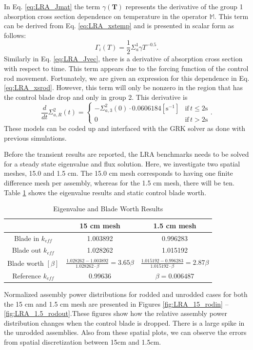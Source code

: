 \documentclass{ansconf}
\numberwithin{equation}{section}
\begin{document}
In Eq. \eqref{eq:LRA_Jmat} the term $\gamma\left(\boldsymbol{T}\right)$  represents the derivative of the group 1 absorption cross section dependence on temperature in the operator $\mathbb{M}$. This term can be derived from Eq. \eqref{eq:LRA_xstemp} and is presented in scalar form as follows:
\begin{equation}
    \Gamma_i\left(T\right) = \frac{1}{2}\Sigma_a^1\gamma T^{-0.5}.
\end{equation}
Similarly in Eq. \eqref{eq:LRA_Jvec}, there is a derivative of absorption cross section with respect to time. This term appears due to the forcing function of the control rod movement. Fortunately, we are given an expression for this dependence in Eq. \eqref{eq:LRA_xsrod}. However, this term will only be nonzero in the region that has the control blade drop and only in group 2. This derivative is
\begin{equation}
    \frac{d}{dt}\Sigma_{a,R}^2\left(t\right) = \left\lbrace \begin{array}{cc} -\Sigma_{a,3}^2\left(0\right)\cdot 0.0606184\left[\mathrm{s}^{-1}\right] & \mathrm{if}\,t\le 2\mathrm{s} \\
    0 & \mathrm{if}\,t > 2\mathrm{s} \end{array}\right. .
\end{equation}
These models can be coded up and interfaced with the GRK solver as done with previous simulations. 


Before the transient results are reported, the LRA benchmarks needs to be solved for a steady state eigenvalue and flux solution. Here, we investigate two spatial meshes, 15.0 and 1.5 cm. The 15.0 cm mesh corresponds to having one finite difference mesh per assembly, whereas for the 1.5 cm mesh, there will be ten. Table \ref{tab:LRA_eigs} shows the eigenvalue results and static control blade worth.
\begin{table}
\centering
\caption{Eigenvalue and Blade Worth Results}
\label{tab:LRA_eigs}
\begin{tabular}{ccc}
\toprule 
 & 15 cm mesh & 1.5 cm mesh\tabularnewline
\midrule
\midrule 
Blade in $k_{eff}$ & 1.003892 & 0.996283\tabularnewline
\midrule 
Blade out $k_{eff}$ & 1.028262 & 1.015192\tabularnewline
\midrule 
Blade worth $\left[\beta\right]$ & $\frac{1.028262-1.003892}{1.028262\cdot\beta}=3.65\beta$ & $\frac{1.015192-0.996283}{1.015192\cdot\beta}=2.87\beta$\tabularnewline
\midrule
\midrule
Reference $k_{eff}$ & 0.99636 & $\beta=0.006487$ \tabularnewline
\bottomrule
\end{tabular}
\end{table}
Normalized assembly power distributions for rodded and unrodded cases for both the 15 cm and 1.5 cm mesh are presented in Figures \ref{fig:LRA_15_rodin} -- \ref{fig:LRA_1.5_rodout}.These figures show how the relative assembly power distribution changes when the control blade is dropped. There is a large spike in the unrodded assemblies.  Also from these spatial plots, we can observe the errors from spatial discretization between 15cm and 1.5cm.




\end{document}
